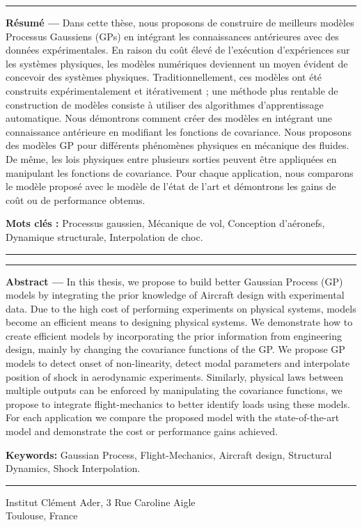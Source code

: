 \begin{vcenterpage}

\noindent\rule[2pt]{\textwidth}{0.5pt}

{\large\textbf{Résumé ---}}
Dans cette thèse, nous proposons de construire de meilleurs modèles Processus Gaussiens (GPs) en intégrant les connaissances antérieures avec des données expérimentales. En raison du coût élevé de l'exécution d'expériences sur les systèmes physiques, les modèles numériques deviennent un moyen évident de concevoir des systèmes physiques. Traditionnellement, ces modèles ont été construits expérimentalement et itérativement ; une méthode plus rentable de construction de modèles consiste à utiliser des algorithmes d'apprentissage automatique. Nous démontrons comment créer des modèles en intégrant une connaissance antérieure en modifiant les fonctions de covariance. Nous proposons des modèles GP pour différents phénomènes physiques en mécanique des fluides. De même, les lois physiques entre plusieurs sorties peuvent être appliquées en manipulant les fonctions de covariance. Pour chaque application, nous comparons le modèle proposé avec le modèle de l’état de l'art et démontrons les gains de coût ou de performance obtenus.

{\large\textbf{Mots clés :}}
    Processus gaussien, Mécanique de vol, Conception d'aéronefs, Dynamique structurale, Interpolation de choc.
\\
\noindent\rule[2pt]{\textwidth}{0.5pt}

\vspace{0.5cm}

\noindent\rule[2pt]{\textwidth}{0.5pt}
{\large\textbf{Abstract ---}}
In this thesis, we propose to build better Gaussian Process (GP) models by integrating the prior knowledge of Aircraft design with experimental data. Due to the high cost of performing experiments on physical systems, models become an efficient means to designing physical systems. We demonstrate how to create efficient models by incorporating the prior information from engineering design, mainly by changing the covariance functions of the GP. We propose GP models to detect onset of non-linearity, detect modal parameters and interpolate position of shock in aerodynamic experiments. Similarly, physical laws between multiple outputs can be enforced by manipulating the covariance functions, we propose to integrate flight-mechanics to better identify loads using these models. For each application we compare the proposed model with the state-of-the-art model and demonstrate the cost or performance gains achieved. 

{\large\textbf{Keywords:}}
    Gaussian Process, Flight-Mechanics, Aircraft design, Structural Dynamics, Shock Interpolation.
\\
\noindent\rule[2pt]{\textwidth}{0.5pt}
\begin{center}
  Institut Cl\'ement Ader, 3 Rue Caroline Aigle\\
  Toulouse, France
\end{center}
\end{vcenterpage}

